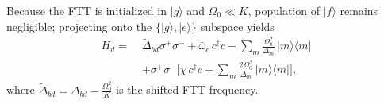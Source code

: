 Because the FTT is initialized in $|g\rangle$ and $\Omega_0\ll K$, population of $|f\rangle$ remains negligible; projecting onto the $\{|g\rangle,|e\rangle\}$ subspace yields
\begin{equation}
\label{eq:Hd_two_level}
\begin{aligned}
H_d=\;&\widetilde{\Delta}_{bd}\sigma^+\sigma^-
+\bar\omega_c\,c^\dagger c
-\sum_m \frac{\Omega_0^2}{\Delta_m}\,|m\rangle\langle m| \\
&+\sigma^+\sigma^-\!\Biggl[
\chi\,c^\dagger c
+\sum_m \frac{2\Omega_0^2}{\Delta_m}\,|m\rangle\langle m|
\Biggr],
\end{aligned}
\end{equation}
where $\widetilde{\Delta}_{bd} = \Delta_{bd}-\frac{\Omega_0^2}{K}$ is the shifted FTT frequency.